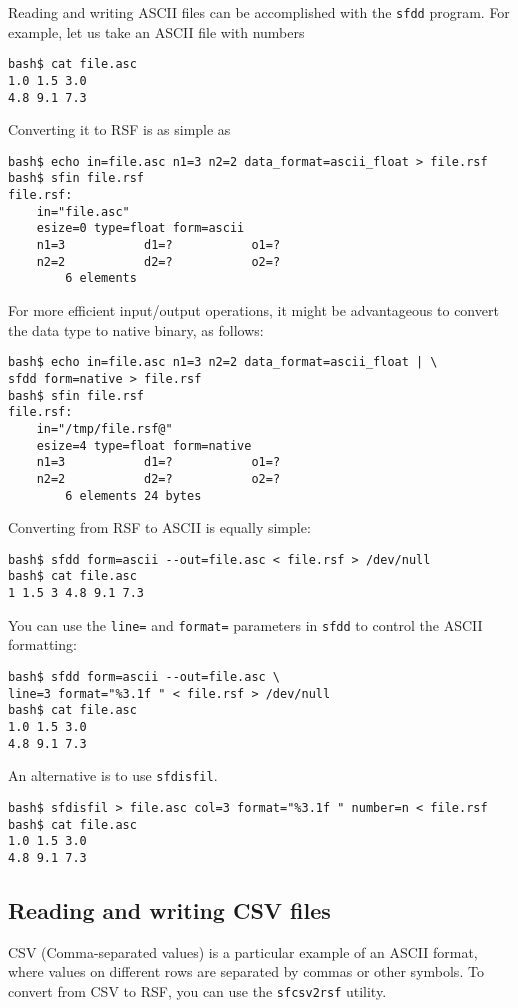 Reading and writing ASCII files can be accomplished with the \texttt{sfdd}
program. For example, let us take an ASCII file with numbers
\begin{verbatim}
bash$ cat file.asc
1.0 1.5 3.0
4.8 9.1 7.3
\end{verbatim}
Converting it to RSF is as simple as
\begin{verbatim}
bash$ echo in=file.asc n1=3 n2=2 data_format=ascii_float > file.rsf
bash$ sfin file.rsf
file.rsf:
    in="file.asc"
    esize=0 type=float form=ascii
    n1=3           d1=?           o1=?
    n2=2           d2=?           o2=?
        6 elements
\end{verbatim}
For more efficient input/output operations, it might be advantageous to
convert the data type to native binary, as follows:
\begin{verbatim}
bash$ echo in=file.asc n1=3 n2=2 data_format=ascii_float | \
sfdd form=native > file.rsf
bash$ sfin file.rsf
file.rsf:
    in="/tmp/file.rsf@"
    esize=4 type=float form=native
    n1=3           d1=?           o1=?
    n2=2           d2=?           o2=?
        6 elements 24 bytes
\end{verbatim}

Converting from RSF to ASCII is equally simple:
\begin{verbatim}
bash$ sfdd form=ascii --out=file.asc < file.rsf > /dev/null
bash$ cat file.asc
1 1.5 3 4.8 9.1 7.3
\end{verbatim}
You can use the \texttt{line=} and \texttt{format=} parameters in
\texttt{sfdd} to control the ASCII formatting:
\begin{verbatim}
bash$ sfdd form=ascii --out=file.asc \
line=3 format="%3.1f " < file.rsf > /dev/null
bash$ cat file.asc
1.0 1.5 3.0
4.8 9.1 7.3
\end{verbatim}
An alternative is to use \texttt{sfdisfil}.
\begin{verbatim}
bash$ sfdisfil > file.asc col=3 format="%3.1f " number=n < file.rsf
bash$ cat file.asc
1.0 1.5 3.0
4.8 9.1 7.3
\end{verbatim}

\subsection{Reading and writing CSV files}

CSV (Comma-separated values) is a particular example of an ASCII
format, where values on different rows are separated by commas or
other symbols. To convert from CSV to RSF, you can use the
\texttt{sfcsv2rsf} utility.

